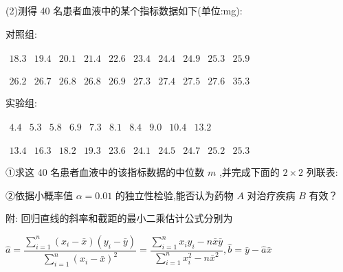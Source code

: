 (2)测得 40 名患者血液中的某个指标数据如下(单位:mg):

对照组:

$\begin{array}{llllllllll} {18.3} & {19.4} & {20.1} & {21.4} & {22.6} & {23.4} & {24.4} & {24.9} & {25.3} & {25.9} \end{array}$

$\begin{array}{llllllllll} {26.2} & {26.7} & {26.8} & {26.8} & {26.9} & {27.3} & {27.4} & {27.5} & {27.6} & {35.3} \end{array}$

实验组:

$\begin{array}{llllllllll} {4.4} & {5.3} & {5.8} & {6.9} & {7.3} & {8.1} & {8.4} & {9.0} & {10.4} & {13.2} \end{array}$

$\begin{array}{llllllllll} {13.4} & {16.3} & {18.2} & {19.3} & {23.6} & {24.1} & {24.5} & {24.7} & {25.2} & {25.3} \end{array}$

①求这 40 名患者血液中的该指标数据的中位数 $m$ ,并完成下面的 $2 \times  2$ 列联表:

\begin{center}
\end{center}

②依据小概率值 $\alpha  = {0.01}$ 的独立性检验,能否认为药物 $A$ 对治疗疾病 $B$ 有效？

附: 回归直线的斜率和截距的最小二乘估计公式分别为

$\widehat{a} = \dfrac{\mathop{\sum }\limits_{{i = 1}}^{n}\left( {{x}_{i} - \bar{x}}\right) \left( {{y}_{i} - \bar{y}}\right) }{\mathop{\sum }\limits_{{i = 1}}^{n}{\left( {x}_{i} - \bar{x}\right) }^{2}} = \dfrac{\mathop{\sum }\limits_{{i = 1}}^{n}{x}_{i}{y}_{i} - n\bar{x}\bar{y}}{\mathop{\sum }\limits_{{i = 1}}^{n}{x}_{i}^{2} - n{\bar{x}}^{2}},\widehat{b} = \bar{y} - \widehat{a}\bar{x}$

